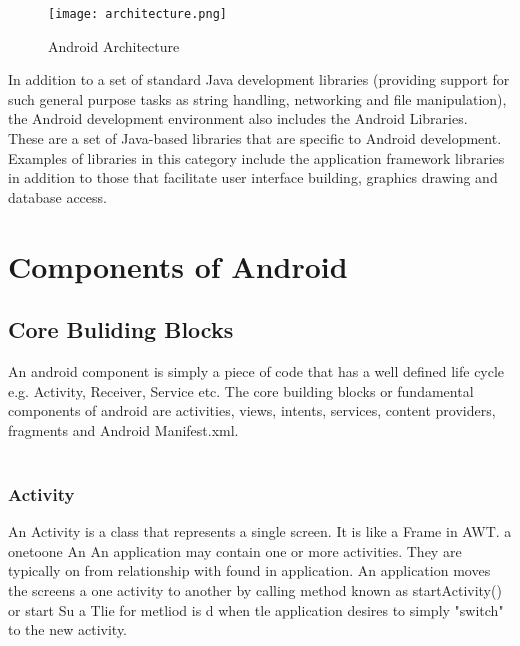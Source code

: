\documentclass[twoside,a4paper,16pt]{book}
\begin{document}
\begin{figure}[ht!]
\begin{center}
\texttt{[image: architecture.png]}
\caption{Android Architecture}
\end{center}
\end{figure}

 \vspace{0.2cm}

In addition to a set of standard Java development libraries (providing support for such general purpose tasks as string handling, networking and file manipulation), the Android development environment also includes the Android Libraries. \\These are a set of Java-based libraries that are specific to Android development. Examples of libraries in this category include the application framework libraries in addition to those that facilitate user interface building, graphics drawing and database access.


\chapter{Components of Android}
\section{Core Buliding Blocks}
An android component is simply a piece of code that has a well defined life cycle e.g. Activity, Receiver, Service etc. The core building blocks or fundamental components of android are activities, views, intents, services, content providers, fragments and Android Manifest.xml.\\\\


\subsection{Activity}
An Activity is a class that represents a single screen. It is like a Frame in AWT. a onetoone An An application may contain one or more activities. They are typically on from relationship with found in application. An application moves the screens a one activity to another by calling method known as startActivity() or start Su a Tlie for metliod is d when tle application desires to simply "switch"  to the new activity. \\
\end{document}
